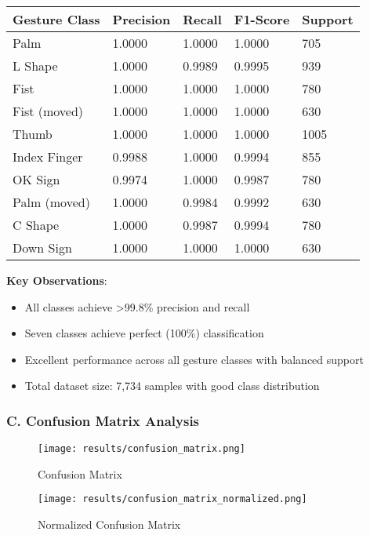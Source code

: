 \documentclass[11pt,a4paper,twoside]{article}
\providecommand{\tightlist}{%
  \setlength{\itemsep}{0pt}\setlength{\parskip}{0pt}}
\begin{document}
\begin{longtable}[]{@{}lllll@{}}
\toprule()
Gesture Class & Precision & Recall & F1-Score & Support \\
\midrule()
\endhead
Palm & 1.0000 & 1.0000 & 1.0000 & 705 \\
L Shape & 1.0000 & 0.9989 & 0.9995 & 939 \\
Fist & 1.0000 & 1.0000 & 1.0000 & 780 \\
Fist (moved) & 1.0000 & 1.0000 & 1.0000 & 630 \\
Thumb & 1.0000 & 1.0000 & 1.0000 & 1005 \\
Index Finger & 0.9988 & 1.0000 & 0.9994 & 855 \\
OK Sign & 0.9974 & 1.0000 & 0.9987 & 780 \\
Palm (moved) & 1.0000 & 0.9984 & 0.9992 & 630 \\
C Shape & 1.0000 & 0.9987 & 0.9994 & 780 \\
Down Sign & 1.0000 & 1.0000 & 1.0000 & 630 \\
\bottomrule()
\end{longtable}

\textbf{Key Observations}:

\begin{itemize}
\tightlist
\item
  All classes achieve \textgreater99.8\% precision and recall
\item
  Seven classes achieve perfect (100\%) classification
\item
  Excellent performance across all gesture classes with balanced support
\item
  Total dataset size: 7,734 samples with good class distribution
\end{itemize}

\subsubsection{C. Confusion Matrix
Analysis}\label{c.-confusion-matrix-analysis}

\begin{figure}
\centering
\texttt{[image: results/confusion\_matrix.png]}
\caption{Confusion Matrix}
\end{figure}

\begin{figure}
\centering
\texttt{[image: results/confusion\_matrix\_normalized.png]}
\caption{Normalized Confusion Matrix}
\end{figure}
\end{document}
